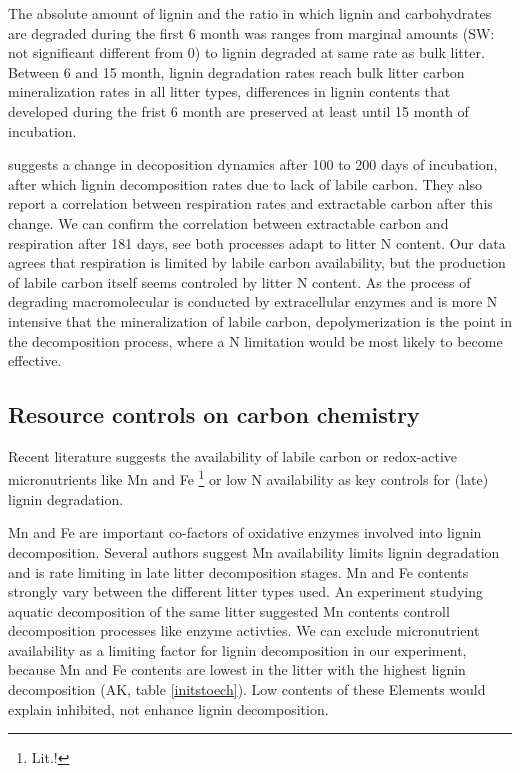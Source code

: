 \documentclass[authoryear,preprint,review,12pt]{elsarticle}
\begin{document}
The absolute amount of lignin and the ratio in which lignin and carbohydrates are degraded during the first 6 month was ranges from marginal amounts (SW: not significant different from 0) to lignin degraded at same rate as bulk litter. Between 6 and 15 month, lignin degradation rates reach bulk litter carbon mineralization rates in all litter types, differences in lignin contents that developed during the frist 6 month are preserved at least until 15 month of incubation.

\cite{Klotzbucher2011} suggests a change in decoposition dynamics after 100 to 200 days of incubation, after which lignin decomposition rates due to lack of labile carbon. They also report a correlation between respiration rates and extractable carbon after this change. We can confirm the correlation between extractable carbon and respiration after 181 days, see both processes adapt to litter N content. Our data agrees that respiration is limited by labile carbon availability, but the production of labile carbon itself seems controled by litter N content. As the process of degrading macromolecular is conducted by extracellular enzymes and is more N intensive that the mineralization of labile carbon, depolymerization is the point in the decomposition process, where a N limitation would be most likely to become effective.

\subsection{Resource controls on carbon chemistry}
Recent literature suggests the availability of labile carbon \citep{Klotzbucher2011} or redox-active micronutrients like Mn and Fe \footnote{Lit.!} or low N availability \citep{Craine2007} as key controls for (late) lignin degradation.

Mn and Fe are important co-factors of oxidative enzymes involved into lignin decomposition. Several authors suggest Mn availability limits lignin degradation and is rate limiting in late litter decomposition stages. Mn and Fe contents strongly vary between the different litter types used. An experiment studying aquatic decomposition of the same litter suggested Mn contents controll decomposition processes like enzyme activties. We can exclude micronutrient availability as a limiting factor for lignin decomposition in our experiment, because Mn and Fe contents are lowest in the litter with the highest lignin decomposition (AK, table \ref{initstoech}). Low contents of these Elements would explain inhibited, not enhance lignin decomposition.
\end{document}
